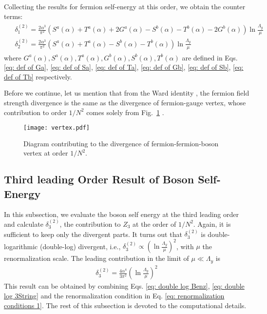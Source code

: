 \documentclass[prx,amsmath,amssymb, notitlepage, onecolumn,
nofootinbib,
superscriptaddress,
longbibliography
]{revtex4-1}
\newcommand{\beq}{\begin{eqnarray}}
\newcommand{\eeq}{\end{eqnarray}}
\newcommand{\ie}{{i.e., }}
\begin{document}
Collecting the results for fermion self-energy at this order, we obtain the counter terms:
\beq
\begin{split}
&\delta_1^{(2)}=\frac{2\alpha^3}{\pi^2}\left(S^a(\alpha)+T^a(\alpha)+2G^a(\alpha)-S^b(\alpha)-T^b(\alpha)-2G^b(\alpha)\right)\ln\frac{\Lambda_y}{\mu}\\
&\delta_2^{(2)}=\frac{2\alpha^3}{\pi^2}\left(S^a(\alpha)+T^a(\alpha)-S^b(\alpha)-T^b(\alpha)\right)\ln\frac{\Lambda_y}{\mu}
\end{split}
\eeq
where $G^a(\alpha), S^a(\alpha), T^a(\alpha), G^b(\alpha), S^b(\alpha), T^b(\alpha)$ are defined in Eqs. \eqref{eq: def of Ga}, \eqref{eq: def of Sa}, \eqref{eq: def of Ta}, \eqref{eq: def of Gb}, \eqref{eq: def of Sb}, \eqref{eq: def of Tb} respectively.

Before we continue, let us mention that from the Ward identity \cite{Metlitski2010}, the fermion field strength divergence is the same as the divergence of fermion-gauge vertex, whose contribution to order $1/N^2$ comes solely from Fig.~\ref{FD: vertex} \cite{Holder2015b}.

\begin{figure}[h]
\begin{center}
\texttt{[image: vertex.pdf]}
\end{center}
\caption{Diagram contributing to the divergence of fermion-fermion-boson vertex at order $1/N^2$.}
\label{FD: vertex}
\end{figure}


\subsection{Third leading Order Result of Boson Self-Energy}

In this subsection, we evaluate the boson self energy at the third leading order and calculate $\delta_3^{(2)}$, the contribution to $Z_3$ at the order of $1/N^2$. Again, it is sufficient to keep only the divergent parts. It turns out that $\delta_3^{(2)}$ is double-logarithmic (double-log) divergent, \ie $\delta_3^{(2)}\propto\left(\ln\frac{\Lambda_y}{\mu}\right)^2$, with $\mu$ the renormalization scale. The leading contribution in the limit of $\mu\ll\Lambda_y$ is
\beq \label{eq: b e 2}
\delta_3^{(2)}=\frac{4\alpha^4}{3\pi^2}\left(\ln\frac{\Lambda_y}{\mu}\right)^2
\eeq
This result can be obtained by combining Eqs. \eqref{eq: double log Benz}, \eqref{eq: double log 3String} and the renormalization condition in Eq. \eqref{eq: renormalization conditions 1}. The rest of this subsection is devoted to the computational details.
\end{document}
